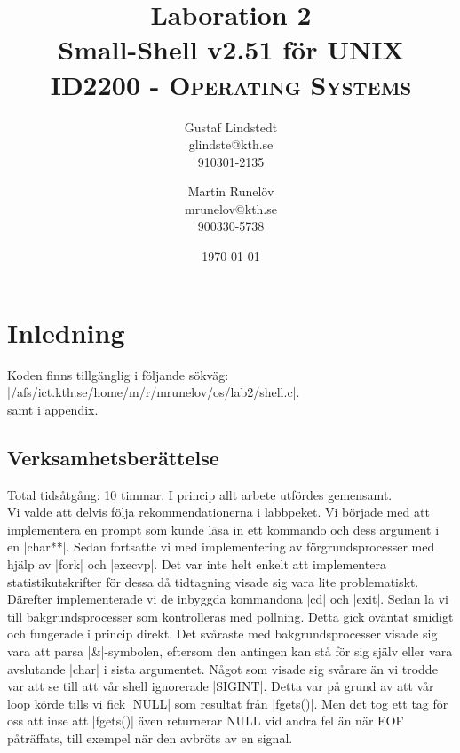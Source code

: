 \documentclass[paper=a4, fontsize=11pt]{scrartcl} %
\title{ 
\huge Laboration 2 \\ Small-Shell v2.51 för UNIX \\ %
\vspace{10pt}
\normalfont \normalsize 
\textsc{ID2200 - Operating Systems } \\ [25pt] %
}
\author{Gustaf Lindstedt \\ glindste@kth.se \\ 910301-2135 \and Martin Runelöv \\ mrunelov@kth.se \\ 900330-5738}
\date{\vspace{8pt}\normalsize\today} %
\numberwithin{equation}{section} %
\numberwithin{figure}{section} %
\numberwithin{table}{section} %
\begin{document}
\maketitle

\section{Inledning}

Koden finns tillgänglig i följande sökväg:\\
|/afs/ict.kth.se/home/m/r/mrunelov/os/lab2/shell.c|.\\

samt i appendix.



\subsection{Verksamhetsberättelse}
Total tidsåtgång: 10 timmar. I princip allt arbete utfördes gemensamt.\\

Vi valde att delvis följa rekommendationerna i labbpeket.
Vi började med att implementera en prompt som kunde läsa in ett kommando och dess argument i en |char**|.
Sedan fortsatte vi med implementering av förgrundsprocesser med hjälp av |fork| och |execvp|.
Det var inte helt enkelt att implementera statistikutskrifter för dessa då tidtagning visade sig vara lite problematiskt.
Därefter implementerade vi de inbyggda kommandona |cd| och |exit|.
Sedan la vi till bakgrundsprocesser som kontrolleras med pollning.
Detta gick oväntat smidigt och fungerade i princip direkt.
Det svåraste med bakgrundsprocesser visade sig vara att parsa |&|-symbolen,
eftersom den antingen kan stå för sig själv eller vara avslutande |char| i sista argumentet.
Något som visade sig svårare än vi trodde var att se till att vår shell ignorerade |SIGINT|.
Detta var på grund av att vår loop körde tills vi fick |NULL| som resultat från |fgets()|.
Men det tog ett tag för oss att inse att |fgets()| även returnerar NULL vid andra fel än när EOF påträffats, till exempel när den avbröts av en signal.
\end{document}
